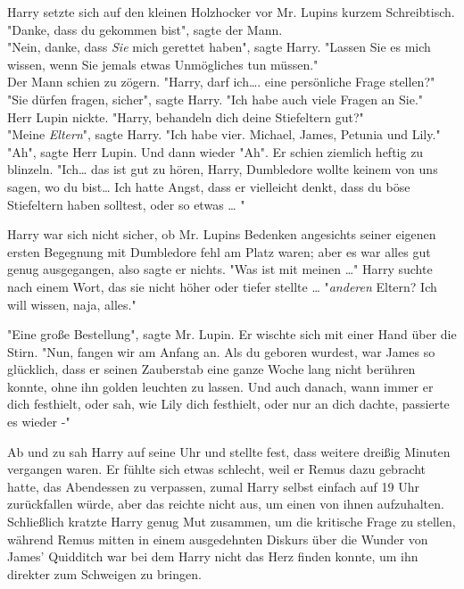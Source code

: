 {Harry setzte sich auf den kleinen Holzhocker vor Mr. Lupins kurzem Schreibtisch.\\ "Danke, dass du gekommen bist", sagte der Mann.\\ "Nein, danke, dass \emph{Sie} mich gerettet haben", sagte Harry. "Lassen Sie es mich wissen, wenn Sie jemals etwas Unmögliches tun müssen."\\ Der Mann schien zu zögern. "Harry, darf ich…. eine persönliche Frage stellen?"\\ "Sie dürfen fragen, sicher", sagte Harry. "Ich habe auch viele Fragen an Sie."\\ Herr Lupin nickte. "Harry, behandeln dich deine Stiefeltern gut?"\\ "Meine \emph{Eltern}", sagte Harry. "Ich habe vier. Michael, James, Petunia und Lily."\\ "Ah", sagte Herr Lupin. Und dann wieder "Ah". Er schien ziemlich heftig zu blinzeln. "Ich… das ist gut zu hören, Harry, Dumbledore wollte keinem von uns sagen, wo du bist… Ich hatte Angst, dass er vielleicht denkt, dass du böse Stiefeltern haben solltest, oder so etwas … "

Harry war sich nicht sicher, ob Mr. Lupins Bedenken angesichts seiner eigenen ersten Begegnung mit Dumbledore fehl am Platz waren; aber es war alles gut genug ausgegangen, also sagte er nichts. "Was ist mit meinen …" Harry suchte nach einem Wort, das sie nicht höher oder tiefer stellte … "\emph{anderen} Eltern? Ich will wissen, naja, alles."

"Eine große Bestellung", sagte Mr. Lupin. Er wischte sich mit einer Hand über die Stirn. "Nun, fangen wir am Anfang an. Als du geboren wurdest, war James so glücklich, dass er seinen Zauberstab eine ganze Woche lang nicht berühren konnte, ohne ihn golden leuchten zu lassen. Und auch danach, wann immer er dich festhielt, oder sah, wie Lily dich festhielt, oder nur an dich dachte, passierte es wieder -"

Ab und zu sah Harry auf seine Uhr und stellte fest, dass weitere dreißig Minuten vergangen waren. Er fühlte sich etwas schlecht, weil er Remus dazu gebracht hatte, das Abendessen zu verpassen, zumal Harry selbst einfach auf 19 Uhr zurückfallen würde, aber das reichte nicht aus, um einen von ihnen aufzuhalten.\\ Schließlich kratzte Harry genug Mut zusammen, um die kritische Frage zu stellen, während Remus mitten in einem ausgedehnten Diskurs über die Wunder von James' Quidditch war bei dem Harry nicht das Herz finden konnte, um ihn direkter zum Schweigen zu bringen.

}
